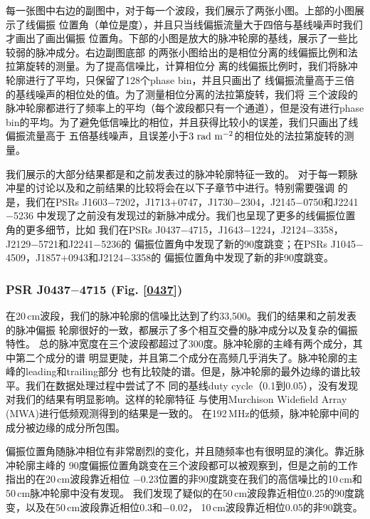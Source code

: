 每一张图中右边的副图中，对于每一个波段，我们展示了两张小图。上部的小图展示了线偏振
位置角（单位是度），并且只当线偏振流量大于四倍与基线噪声时我们才画出了画出偏振
位置角。下部的小图是放大的脉冲轮廓的基线，展示了一些比较弱的脉冲成分。右边副图底部
的两张小图给出的是相位分离的线偏振比例和法拉第旋转的测量。为了提高信噪比，计算相位分
离的线偏振比例时，我们将脉冲轮廓进行了平均，只保留了128个phase bin，并且只画出了
线偏振流量高于三倍的基线噪声的相位处的值。为了测量相位分离的法拉第旋转，我们将
三个波段的脉冲轮廓都进行了频率上的平均（每个波段都只有一个通道），但是没有进行phase 
bin的平均。为了避免低信噪比的相位，并且获得比较小的误差，我们只画出了线偏振流量高于
五倍基线噪声，且误差小于$3\ \rm{rad\ m^{-2}}$的相位处的法拉第旋转的测量。

我们展示的大部分结果都是和之前发表过的脉冲轮廓特征一致的\supercite{Ord04,Yan11a}。
对于每一颗脉冲星的讨论以及和之前结果的比较将会在以下子章节中进行。特别需要强调
的是，我们在PSRs J1603$-$7202，J1713$+$0747，J1730$-$2304，J2145$-$0750和J2241$-$5236
中发现了之前没有发现过的新脉冲成分。我们也呈现了更多的线偏振位置角的更多细节，比如
我们在PSRs J0437$-$4715，J1643$-$1224，J2124$-$3358，J2129$-$5721和J2241$-$5236的
偏振位置角中发现了新的90度跳变；在PSRs J1045$-$4509，J1857$+$0943和J2124$-$3358的
偏振位置角中发现了新的非90度跳变。

\subsubsection{PSR J0437$-$4715 (Fig. \ref{0437})}

在20\,cm波段，我们的脉冲轮廓的信噪比达到了约33,500。我们的结果和之前发表的脉冲偏振
轮廓很好的一致，都展示了多个相互交疊的脉冲成分以及复杂的偏振特性\supercite{Johnston93,Manchester95a,Navarro97,Yan11a}。
总的脉冲宽度在三个波段都超过了300度。脉冲轮廓的主峰有两个成分，其中第二个成分的谱
明显更陡，并且第二个成分在高频几乎消失了。脉冲轮廓的主峰的leading和trailing部分
也有比较陡的谱。但是，脉冲轮廓的最外边缘的谱比较平。我们在数据处理过程中尝试了不
同的基线duty cycle（0.1到0.05），没有发现对我们的结果有明显影响。这样的轮廓特征
与使用Murchison Widefield Array (MWA)进行低频观测得到的结果是一致的\supercite{Bhat14}。
在192\,MHz的低频，脉冲轮廓中间的成分被边缘的成分所包围。

偏振位置角随脉冲相位有非常剧烈的变化，并且随频率也有很明显的演化。靠近脉冲轮廓主峰的
90度偏振位置角跳变在三个波段都可以被观察到，但是之前的工作指出的在20\,cm波段靠近相位
$-0.23$位置的非90度跳变在我们的高信噪比的10\,cm和50\,cm脉冲轮廓中没有发现。
我们发现了疑似的在50\,cm波段靠近相位0.25的90度跳变，以及在50\,cm波段靠近相位0.3和$-0.02$，
10\,cm波段靠近相位0.05的非90跳变。

